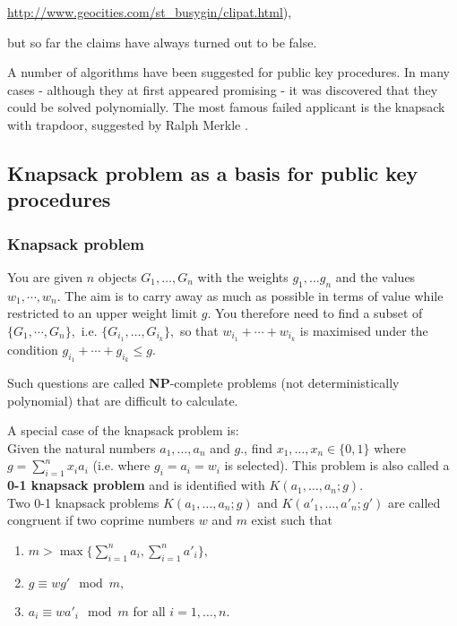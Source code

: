 \href{http://www.geocities.com/st_busygin/clipat.html}{
http://www.geocities.com/st\_busygin/clipat.html}), 

but so far the claims have always turned out to be false.

A number of algorithms have been suggested for public key procedures. In many 
cases - although they at first appeared promising - it was discovered that they 
could be solved polynomially. The most famous failed applicant is the knapsack 
with trapdoor, suggested by Ralph Merkle \cite{Merkle1978}.

\newpage
\subsection{Knapsack problem as a basis for public key procedures}
\subsubsection{Knapsack problem}

You are given $ n $ objects $ G_1, \dots, G_n $ with the weights $ g_1, \dots 
g_n $ and the values $w_1, \cdots, w_n. $ The aim is to carry away as much as 
possible in terms of value while restricted to an upper weight limit $ g $. You 
therefore need to find a subset of $ \{ G_1, \cdots,G_n\}, $ i.e. $ \{G_{i_1}, 
\dots ,G_{i_k} \}, $ so that $ w_{i_1}+ \cdots +w_{i_k} $ is maximised under the 
condition $  g_{i_1}+ \cdots +g_{i_k} \leq g. $ \par
Such questions are called {\bf NP}-complete problems (not  deterministically polynomial) that are difficult to 
calculate.

A special case of the knapsack problem is:\\
Given the natural numbers $ a_1, \dots, a_n $   and $ g .$,
find $ x_1, \dots, x_n \in \{ 0,1\} $  where $ g = \sum_{i=1}^{n}x_i a_i $  
(i.e. where $ g_i = a_i = w_i $ is selected). This problem is also called a  
{\bf 0-1 knapsack problem} and is identified with $ K(a_1, \dots, a_n;g) $.\\

Two 0-1 knapsack problems  $ K(a_1, \dots, a_n;g) $   and  $ K(a'_1, \dots, 
a'_n;g') $  are called congruent if two  coprime numbers $ w $ 
and $ m $ exist such that
\begin{enumerate}
    \item $ m > \max \{ \sum_{i=1}^n a_i , \sum_{i=1}^n a'_i \}, $

    \item $ g \equiv wg' \mod m, $

    \item $ a_i \equiv w a'_i \mod m $ for all $ i=1, \dots, n.$

\end{enumerate}
 

